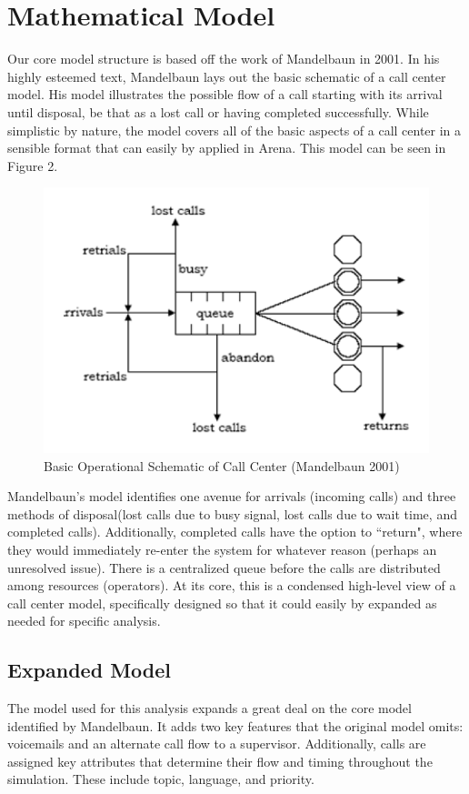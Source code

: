 \documentclass[12pt,twocolumn]{article}
\begin{document}
\section{Mathematical Model}

Our core model structure is based off the work of Mandelbaun in 2001\cite{mandelbaun}.  In his highly esteemed text, Mandelbaun lays out the basic schematic of a call center model.  His model illustrates the possible flow of a call starting with its arrival until disposal, be that as a lost call or having completed successfully.  While simplistic by nature, the model covers all of the basic aspects of a call center in a sensible format that can easily by applied in Arena.  This model can be seen in Figure 2.  

	\begin{figure}[h]
	\includegraphics[scale=.45]{call_center_layout.png}
	\caption{Basic Operational Schematic of Call Center (Mandelbaun 2001)}
	\end{figure}

Mandelbaun's model identifies one avenue for arrivals (incoming calls) and three methods of disposal(lost calls due to busy signal, lost calls due to wait time, and completed calls).  Additionally, completed calls have the option to ``return", where they would immediately re-enter the system for whatever reason (perhaps an unresolved issue).  There is a centralized queue before the calls are distributed among resources (operators).  At its core, this is a condensed high-level view of a call center model, specifically designed so that it could easily by expanded as needed for specific analysis.

\subsection{Expanded Model}
The model used for this analysis expands a great deal on the core model identified by Mandelbaun.  It adds two key features that the original model omits: voicemails and an alternate call flow to a supervisor.  Additionally, calls are assigned key attributes that determine their flow and timing throughout the simulation.  These include topic, language, and priority.
\end{document}
